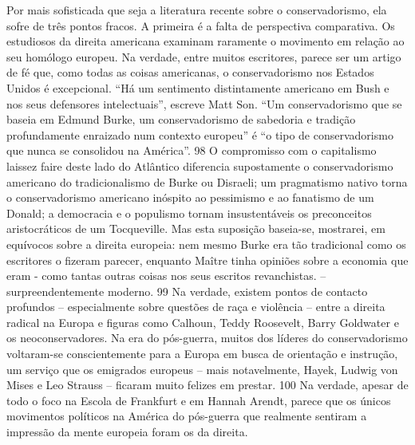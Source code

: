  
\par
 
Por mais sofisticada que seja a literatura recente sobre o conservadorismo, ela sofre de três pontos fracos. A primeira é a falta de perspectiva comparativa. Os estudiosos da direita americana examinam raramente o movimento em relação ao seu homólogo europeu. Na verdade, entre muitos escritores, parece ser um artigo de fé que, como todas as coisas americanas, o conservadorismo nos Estados Unidos é excepcional. “Há um sentimento distintamente americano em Bush e nos seus defensores intelectuais”, escreve Matt Son. “Um conservadorismo que se baseia em Edmund Burke, um conservadorismo de sabedoria e tradição profundamente enraizado num contexto europeu” é “o tipo de conservadorismo que nunca se consolidou na América”.
 {\color{blue} 98}  
O compromisso com o capitalismo laissez faire deste lado do Atlântico diferencia supostamente o conservadorismo americano do tradicionalismo de Burke ou Disraeli; um pragmatismo nativo torna o conservadorismo americano inóspito ao pessimismo e ao fanatismo de um Donald; a democracia e o populismo tornam insustentáveis ​​os preconceitos aristocráticos de um Tocqueville. Mas esta suposição baseia-se, mostrarei, em equívocos sobre a direita europeia: nem mesmo Burke era tão tradicional como os escritores o fizeram parecer, enquanto Maître tinha opiniões sobre a economia que eram - como tantas outras coisas nos seus escritos revanchistas. – surpreendentemente moderno.
 {\color{blue} 99}  
Na verdade, existem pontos de contacto profundos – especialmente sobre questões de raça e violência – entre a direita radical na Europa e figuras como Calhoun, Teddy Roosevelt, Barry Goldwater e os neoconservadores. Na era do pós-guerra, muitos dos líderes do conservadorismo voltaram-se conscientemente para a Europa em busca de orientação e instrução, um serviço que os emigrados europeus – mais notavelmente, Hayek, Ludwig von Mises e Leo Strauss – ficaram muito felizes em prestar.
 {\color{blue} 100}  
Na verdade, apesar de todo o foco na Escola de Frankfurt e em Hannah Arendt, parece que os únicos movimentos políticos na América do pós-guerra que realmente sentiram a impressão da mente europeia foram os da direita.
 
\par
 
